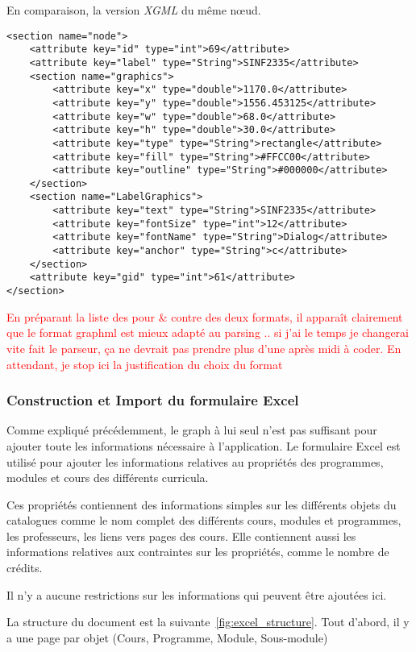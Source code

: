 En comparaison, la version \textit{XGML} du même nœud.
\begin{lstlisting}
<section name="node">
	<attribute key="id" type="int">69</attribute>
	<attribute key="label" type="String">SINF2335</attribute>
	<section name="graphics">
		<attribute key="x" type="double">1170.0</attribute>
		<attribute key="y" type="double">1556.453125</attribute>
		<attribute key="w" type="double">68.0</attribute>
		<attribute key="h" type="double">30.0</attribute>
		<attribute key="type" type="String">rectangle</attribute>
		<attribute key="fill" type="String">#FFCC00</attribute>
		<attribute key="outline" type="String">#000000</attribute>
	</section>
	<section name="LabelGraphics">
		<attribute key="text" type="String">SINF2335</attribute>
		<attribute key="fontSize" type="int">12</attribute>
		<attribute key="fontName" type="String">Dialog</attribute>
		<attribute key="anchor" type="String">c</attribute>
	</section>
	<attribute key="gid" type="int">61</attribute>
</section>
\end{lstlisting}
\textcolor{red}{En préparant la liste des pour \& contre des deux formats, il apparaît clairement que le format graphml est mieux adapté au parsing .. si j'ai le temps je changerai vite fait le parseur, ça ne devrait pas prendre plus d'une après midi à coder. En attendant, je stop ici la justification du choix du format} 
\subsubsection{Construction et Import du formulaire Excel}
Comme expliqué précédemment, le graph à lui seul n'est pas suffisant pour ajouter toute les informations nécessaire à l'application. Le formulaire Excel est utilisé pour ajouter les informations relatives au propriétés des programmes, modules et cours des différents curricula. 

Ces propriétés contiennent des informations simples sur les différents objets du catalogues comme le nom complet des différents cours, modules et programmes, les professeurs, les liens vers pages des cours. Elle contiennent aussi les informations relatives aux contraintes sur les propriétés, comme le nombre de crédits.

Il n'y a aucune restrictions sur les informations qui peuvent être ajoutées ici. 

La structure du document est la suivante~\ref{fig:excel_structure}. Tout d'abord, il y a une page par objet (Cours, Programme, Module, Sous-module)

